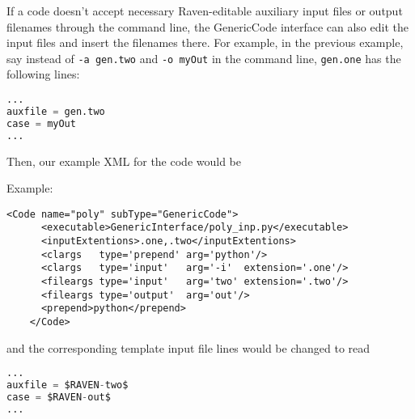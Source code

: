 If a code doesn't accept necessary Raven-editable auxiliary input files
or output filenames through the command line, the GenericCode interface
can also edit the input files and insert the filenames there.  For example,
in the previous example, say instead of \texttt{-a gen.two} and \texttt{-o myOut}
in the command line, \texttt{gen.one} has the following lines:
\begin{lstlisting}[language=python]
...
auxfile = gen.two
case = myOut
...
\end{lstlisting}
Then, our example XML for the code would be

Example:
\begin{lstlisting}[style=XML]
    <Code name="poly" subType="GenericCode">
      <executable>GenericInterface/poly_inp.py</executable>
      <inputExtentions>.one,.two</inputExtentions>
      <clargs   type='prepend' arg='python'/>
      <clargs   type='input'   arg='-i'  extension='.one'/>
      <fileargs type='input'   arg='two' extension='.two'/>
      <fileargs type='output'  arg='out'/>
      <prepend>python</prepend>
    </Code>
\end{lstlisting}
and the corresponding template input file lines would be changed to read
\begin{lstlisting}[language=python]
...
auxfile = $RAVEN-two$
case = $RAVEN-out$
...
\end{lstlisting}

